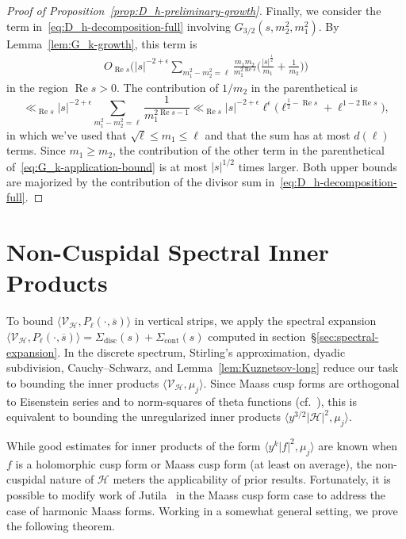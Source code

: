 \documentclass[11pt,reqno]{amsart}
\theoremstyle{plain}
\theoremstyle{definition}
\numberwithin{equation}{section}
\renewcommand{\Re}{\operatorname{Re}}
\begin{document}
\begin{proof}[Proof of Proposition~\ref{prop:D_h-preliminary-growth}]
Finally, we consider the term in~\eqref{eq:D_h-decomposition-full} involving $G_{3/2}(s,m_2^2,m_1^2)$. By Lemma~\ref{lem:G_k-growth}, this term is
\begin{align} \label{eq:G_k-application-bound}
	O_{\Re s} \Big(\vert s \vert^{-2+\epsilon} \sum_{m_1^2 - m_2^2 = \ell} \frac{m_1 m_2}{m_1^{2\Re s}}
	\Big( \frac{\vert s \vert^{\frac{1}{2}}}{m_1} + \frac{1}{m_2} \Big) \Big)
\end{align}
in the region $\Re s > 0$. The contribution of $1/m_2$ in the parenthetical is 
\[
	\ll_{\Re s}
	\vert s \vert^{-2+\epsilon} \sum_{m_1^2 - m_2^2 = \ell} \frac{1}{m_1^{2\Re s -1}}
	\ll_{\Re s} \vert s \vert^{-2+\epsilon} \ell^\epsilon \big(\ell^{\frac{1}{2} - \Re s} + \ell^{1-2\Re s} \big),
\]
in which we've used that $\sqrt{\ell} \leq m_1 \leq \ell$ and that the sum has at most $d(\ell)$ terms. Since $m_1 \geq m_2$, the contribution of the other term in the parenthetical of~\eqref{eq:G_k-application-bound} is at most $\vert s \vert^{1/2}$ times larger. Both upper bounds are majorized by the contribution of the divisor sum in~\eqref{eq:D_h-decomposition-full}.
\end{proof}


\section{Non-Cuspidal Spectral Inner Products} \label{sec:jutila-triple-inner-products}

To bound $\langle \mathcal{V}_\mathcal{H}, P_\ell(\cdot, \overline{s}) \rangle$ in vertical strips, we apply the spectral expansion $\langle \mathcal{V}_\mathcal{H}, P_\ell(\cdot, \overline{s}) \rangle = \Sigma_{\mathrm{disc}}(s) + \Sigma_{\mathrm{cont}}(s)$ computed in section~\S{\ref{sec:spectral-expansion}}. 
In the discrete spectrum, Stirling's approximation, dyadic subdivision, Cauchy--Schwarz, and Lemma~\ref{lem:Kuznetsov-long} reduce our task to bounding the inner products $\langle \mathcal{V}_\mathcal{H}, \mu_j \rangle$.
Since Maass cusp forms are orthogonal to Eisenstein series and to norm-squares of theta functions (cf.~\cite[Remark 2]{Nelson21}), this is equivalent to bounding the unregularized inner products $\langle y^{3/2} \vert \mathcal{H} \vert^2 , \mu_j \rangle$.

While good estimates for inner products of the form $\langle y^k \vert f \vert^2 , \mu_j \rangle$ are known when $f$ is a holomorphic cusp form or Maass cusp form (at least on average), the non-cuspidal nature of $\mathcal{H}$ meters the applicability of prior results. Fortunately, it is possible to modify work of Jutila~\cite{Jutila96,Jutila97} in the Maass cusp form case to address the case of harmonic Maass forms. %
Working in a somewhat general setting, we prove the following theorem.
\end{document}
